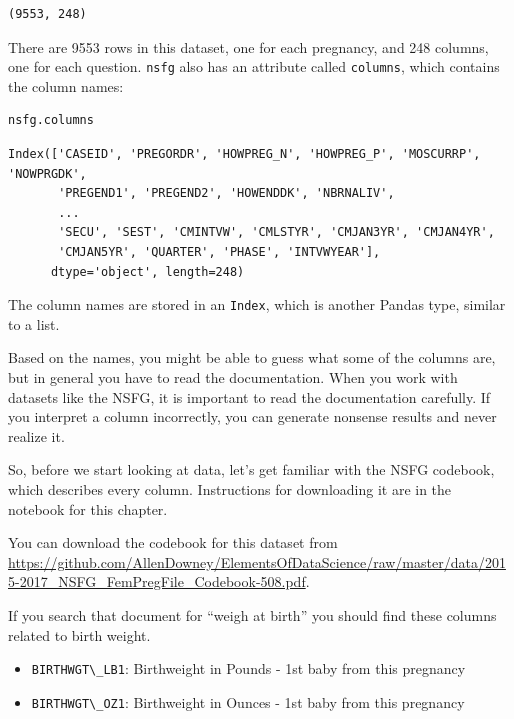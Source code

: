 \documentclass[
]{book}
\newcommand{\passthrough}[1]{#1}
\begin{document}
\begin{lstlisting}
(9553, 248)
\end{lstlisting}

There are 9553 rows in this dataset, one for each pregnancy, and 248
columns, one for each question. \passthrough{\lstinline!nsfg!} also has
an attribute called \passthrough{\lstinline!columns!}, which contains
the column names:

\begin{lstlisting}[language=Python]
nsfg.columns
\end{lstlisting}

\begin{lstlisting}
Index(['CASEID', 'PREGORDR', 'HOWPREG_N', 'HOWPREG_P', 'MOSCURRP', 'NOWPRGDK',
       'PREGEND1', 'PREGEND2', 'HOWENDDK', 'NBRNALIV',
       ...
       'SECU', 'SEST', 'CMINTVW', 'CMLSTYR', 'CMJAN3YR', 'CMJAN4YR',
       'CMJAN5YR', 'QUARTER', 'PHASE', 'INTVWYEAR'],
      dtype='object', length=248)
\end{lstlisting}

The column names are stored in an \passthrough{\lstinline!Index!}, which
is another Pandas type, similar to a list.

Based on the names, you might be able to guess what some of the columns
are, but in general you have to read the documentation. When you work
with datasets like the NSFG, it is important to read the documentation
carefully. If you interpret a column incorrectly, you can generate
nonsense results and never realize it.

So, before we start looking at data, let's get familiar with the NSFG
codebook, which describes every column. Instructions for downloading it
are in the notebook for this chapter.

You can download the codebook for this dataset from
\url{https://github.com/AllenDowney/ElementsOfDataScience/raw/master/data/2015-2017_NSFG_FemPregFile_Codebook-508.pdf}.

If you search that document for ``weigh at birth'' you should find these
columns related to birth weight.

\begin{itemize}
\item
  \passthrough{\lstinline!BIRTHWGT\_LB1!}: Birthweight in Pounds - 1st
  baby from this pregnancy
\item
  \passthrough{\lstinline!BIRTHWGT\_OZ1!}: Birthweight in Ounces - 1st
  baby from this pregnancy
\end{itemize}
\end{document}
